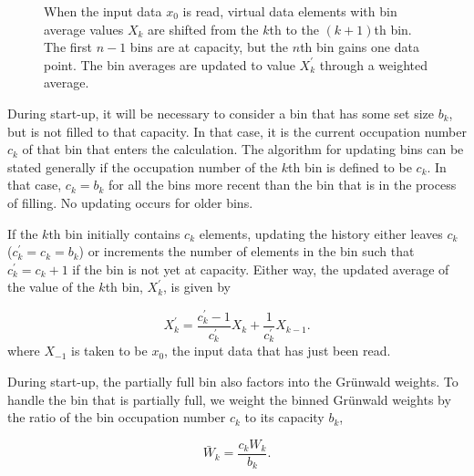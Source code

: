 \begin{figure}

\caption{When the input data $x_0$ is read, virtual data elements with bin average values $X_k$ are shifted from the $k$th to the $(k+1)$th bin. The first $n-1$ bins are at capacity, but the $n$th bin gains one data point. The bin averages are updated to value $X_k^\prime$ through a weighted average.}
\label{fig:binShifting}
\end{figure}

During start-up, it will be necessary to consider a bin that has some
set size $b_k$, but is not filled to that capacity. In that case, it
is the current occupation number $c_k$ of that bin that enters the
calculation. The algorithm for updating bins can be stated generally if the occupation number of the $k$th bin is defined to be $c_k$. In that case, $c_k=b_k$ for all the bins more recent than the bin that is in the process of filling. No updating occurs for older bins. 

If the $k$th bin initially contains $c_k$ elements,
updating the history either leaves $c_k$ ($c_k^\prime=c_k=b_k$) or
increments the number of elements in the bin such that $c_k^\prime =
c_k + 1$ if the bin is not yet at capacity. Either way, the updated
average of the value of the $k$th bin, $X_k^\prime$, is given by

\begin{equation}
X_k^\prime = \frac{c_k^\prime-1}{c_k^\prime}X_k + \frac{1}{c_k^\prime}X_{k-1}.
\label{eqn:updating}
\end{equation}
where $X_{-1}$ is taken to be $x_0$, the input data that has just been
read. 

During start-up, the partially full bin also factors into
the Gr{\"u}nwald weights. To handle the bin that is partially full, we
weight the binned Gr{\"u}nwald weights by the ratio of the bin occupation
number $c_k$ to its capacity $b_k$,

\begin{equation}
\bar{W}_k= \frac{c_k W_k}{b_k}.
\label{eqn:Wbar}
\end{equation} 







